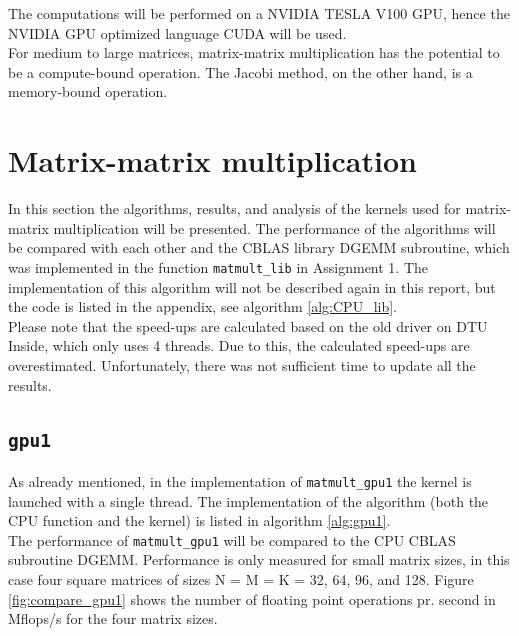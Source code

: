 \noindent The computations will be performed on a NVIDIA TESLA V100 GPU, hence the NVIDIA GPU optimized language CUDA will be used.\\

\noindent For medium to large matrices, matrix-matrix multiplication has the potential to be a compute-bound operation. The Jacobi method, on the other hand, is a memory-bound operation. %





\newpage

\section{Matrix-matrix multiplication}
In this section the algorithms, results, and analysis of the kernels used for matrix-matrix multiplication will be presented. The performance of the algorithms will be compared with each other and the CBLAS library DGEMM subroutine, which was implemented in the function \texttt{matmult\_lib} in Assignment 1. The implementation of this algorithm will not be described again in this report, but the code is listed in the appendix, see algorithm \ref{alg:CPU_lib}.\\
Please note that the speed-ups are calculated based on the old driver on DTU Inside, which only uses 4 threads. Due to this, the calculated speed-ups are overestimated. Unfortunately, there was not sufficient time to update all the results.

\subsection{\texttt{gpu1}}
As already mentioned, in the implementation of \texttt{matmult\_gpu1} the kernel is launched with a single thread. The implementation of the algorithm (both the CPU function and the kernel) is listed in algorithm \ref{alg:gpu1}.\\



\noindent The performance of \texttt{matmult\_gpu1} will be compared to the CPU CBLAS subroutine DGEMM. Performance is only measured for small matrix sizes, in this case four square matrices of sizes N = M = K = 32, 64, 96, and 128. Figure \ref{fig:compare_gpu1} shows the number of floating point operations pr. second in Mflops/s for the four matrix sizes.\\

